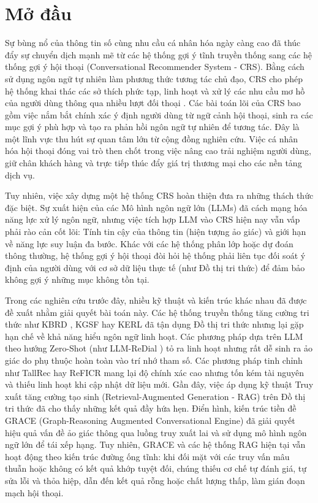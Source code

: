 \chapter*{Mở đầu}

Sự bùng nổ của thông tin số cùng nhu cầu cá nhân hóa ngày càng cao đã thúc đẩy sự chuyển dịch mạnh mẽ từ các hệ thống gợi ý tĩnh truyền thống sang các hệ thống gợi ý hội thoại (Conversational Recommender System - CRS). Bằng cách sử dụng ngôn ngữ tự nhiên làm phương thức tương tác chủ đạo, CRS cho phép hệ thống khai thác các sở thích phức tạp, linh hoạt và xử lý các nhu cầu mơ hồ của người dùng thông qua nhiều lượt đối thoại \cite{li2018towards, christakopoulou2016towardscrs}. Các bài toán lõi của CRS bao gồm việc nắm bắt chính xác ý định người dùng từ ngữ cảnh hội thoại, sinh ra các mục gợi ý phù hợp và tạo ra phản hồi ngôn ngữ tự nhiên để tương tác. Đây là một lĩnh vực thu hút sự quan tâm lớn từ cộng đồng nghiên cứu. Việc cá nhân hóa hội thoại đóng vai trò then chốt trong việc nâng cao trải nghiệm người dùng, giữ chân khách hàng và trực tiếp thúc đẩy giá trị thương mại cho các nền tảng dịch vụ.

Tuy nhiên, việc xây dựng một hệ thống CRS hoàn thiện đưa ra những thách thức đặc biệt. Sự xuất hiện của các Mô hình ngôn ngữ lớn (LLMs) đã cách mạng hóa năng lực xử lý ngôn ngữ, nhưng việc tích hợp LLM vào CRS hiện nay vẫn vấp phải rào cản cốt lõi: Tính tin cậy của thông tin (hiện tượng ảo giác) và giới hạn về năng lực suy luận đa bước. Khác với các hệ thống phân lớp hoặc dự đoán thông thường, hệ thống gợi ý hội thoại đòi hỏi hệ thống phải liên tục đối soát ý định của người dùng với cơ sở dữ liệu thực tế (như Đồ thị tri thức) để đảm bảo không gợi ý những mục không tồn tại.

Trong các nghiên cứu trước đây, nhiều kỹ thuật và kiến trúc khác nhau đã được đề xuất nhằm giải quyết bài toán này. Các hệ thống truyền thống tăng cường tri thức như KBRD \cite{chen-etal-2019-towards}, KGSF \cite{zhou2020improvingcrs} hay KERL \cite{Qiu_2025} đã tận dụng Đồ thị tri thức nhưng lại gặp hạn chế về khả năng hiểu ngôn ngữ linh hoạt. Các phương pháp dựa trên LLM theo hướng Zero-Shot (như LLM-ReDial \cite{liang-etal-2024-llm}) tỏ ra linh hoạt nhưng rất dễ sinh ra ảo giác do phụ thuộc hoàn toàn vào trí nhớ tham số. Các phương pháp tinh chỉnh như TallRec \cite{bao2023tallrec} hay ReFICR \cite{yang-2024-reficr} mang lại độ chính xác cao nhưng tốn kém tài nguyên và thiếu linh hoạt khi cập nhật dữ liệu mới. Gần đây, việc áp dụng kỹ thuật Truy xuất tăng cường tạo sinh (Retrieval-Augmented Generation - RAG) trên Đồ thị tri thức đã cho thấy những kết quả đầy hứa hẹn. Điển hình, kiến trúc tiền đề GRACE (Graph-Reasoning Augmented Conversational Engine) đã giải quyết hiệu quả vấn đề ảo giác thông qua luồng truy xuất lai và sử dụng mô hình ngôn ngữ lớn để tái xếp hạng. Tuy nhiên, GRACE và các hệ thống RAG hiện tại vẫn hoạt động theo kiến trúc đường ống tĩnh: khi đối mặt với các truy vấn mâu thuẫn hoặc không có kết quả khớp tuyệt đối, chúng thiếu cơ chế tự đánh giá, tự sửa lỗi và thỏa hiệp, dẫn đến kết quả rỗng hoặc chất lượng thấp, làm gián đoạn mạch hội thoại.


